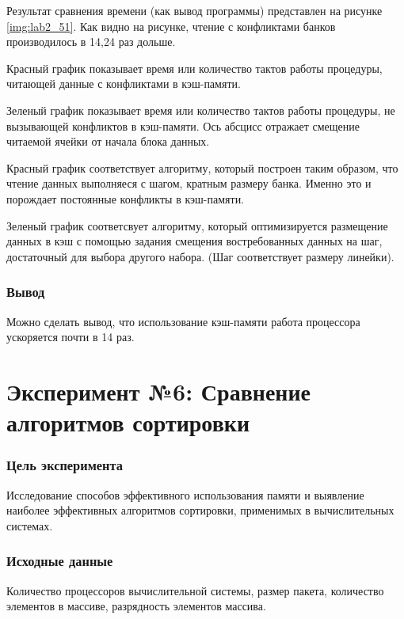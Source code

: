 
Результат сравнения времени (как вывод программы) представлен на рисунке \ref{img:lab2_51}. Как видно на рисунке, чтение с конфликтами банков производилось в 14,24 раз дольше.

\newpage

Красный график показывает время или количество тактов работы процедуры, читающей данные с конфликтами в кэш-памяти. 

Зеленый график показывает время или количество тактов работы процедуры, не вызывающей конфликтов в кэш-памяти. Ось абсцисс отражает смещение читаемой ячейки от начала блока данных.

Красный график соответствует алгоритму, который построен таким образом, что чтение данных выполняеся с шагом, кратным размеру банка. Именно это и порождает постоянные конфликты в кэш-памяти.

Зеленый график соответсвует алгоритму, который оптимизируется размещение данных в кэш с помощью задания смещения востребованных данных на шаг, достаточный для выбора другого набора. (Шаг соответствует размеру линейки).

\subsection*{Вывод}
Можно сделать вывод, что использование кэш-памяти работа процессора ускоряется почти в 14 раз.


\chapter*{Эксперимент №6: Сравнение алгоритмов сортировки}

\subsection*{Цель эксперимента}
Исследование способов эффективного использования памяти и выявление наиболее эффективных алгоритмов сортировки, применимых в вычислительных системах. 

\subsection*{Исходные данные}
Количество процессоров вычислительной системы, размер пакета, количество элементов в массиве, разрядность элементов массива.

